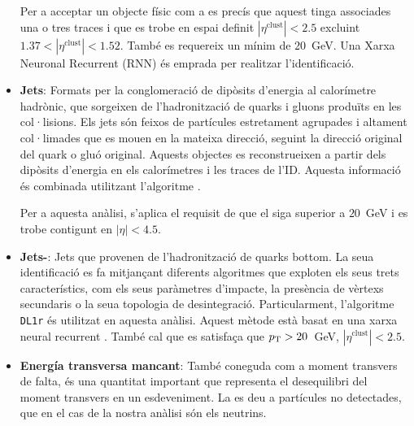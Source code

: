\begin{itemize}
					Per a acceptar un
					objecte físic com a \tauhad es precís que aquest tinga associades una o tres 
					traces i que es trobe en espai definit $|\eta^\mathrm{clust}| < 2.5$ excluint 
					$1.37 < |\eta^\mathrm{clust}| < 1.52$.  També es requereix un \pT mínim
					de $20$~GeV. Una Xarxa Neuronal Recurrent (RNN) és emprada per
					realitzar l'identificació.

\item \textbf{Jets}: 	Formats per la conglomeració de dipòsits d'energia al calorímetre hadrònic, 
				que sorgeixen de l'hadronització de quarks i gluons produïts en les col·lisions.
				Els jets són feixos de partícules estretament agrupades i altament col·limades 
				que es mouen en la mateixa direcció, seguint la direcció original del quark o gluó original.
				Aquests objectes es reconstrueixen a partir dels dipòsits d’energia en els calorímetres i 
				les traces de l'ID.  Aquesta informació és combinada utilitzant l’algoritme \Akt 
				\cite{Cacciari:2008gp}.  
				
				Per a aquesta anàlisi, s'aplica el requisit de que el \pT siga superior a $20$~GeV
				i es trobe contigunt en $|\eta|<4.5$. 
				
\item \textbf{Jets-\Pbottom}:	Jets que provenen de l'hadronització de quarks bottom.
						La seua identificació es fa mitjançant diferents algoritmes 
						que exploten els seus trets característics, com els seus paràmetres 
						d’impacte, la presència de vèrtexs secundaris o la seua topologia de 
						desintegració. Particularment, l'algoritme \texttt{DL1r} és utilitzat en
						aquesta anàlisi. Aquest mètode està basat en una xarxa neural recurrent
						\cite{ATL-PHYS-PUB-2017-003}. 
						També cal que es satisfaça que  $p_{\text{T}} > 20$~GeV, $|\eta^\mathrm{clust}| < 2.5$.
						
\item \textbf{Energía transversa mancant}:  També coneguda com a moment transvers de falta, 
						és una quantitat important que representa el desequilibri del moment 
						transvers en un esdeveniment. La \MET es deu a partícules no detectades,
						 que en el cas de la nostra anàlisi són els neutrins.

\end{itemize}

